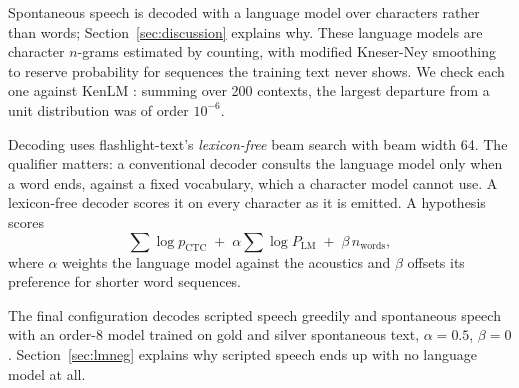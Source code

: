 Spontaneous speech is decoded with a language model over characters rather
than words; Section~\ref{sec:discussion} explains why. These language models
are character $n$-grams estimated by counting, with modified
Kneser-Ney smoothing \cite{chen1996smoothing} to reserve probability for
sequences the training text never shows. We check each one against KenLM
\cite{heafield2011kenlm}: summing over 200 contexts, the largest departure from
a unit distribution was of order $10^{-6}$.

Decoding uses flashlight-text's \emph{lexicon-free} beam search
\cite{kahn2022flashlight} with beam width 64. The qualifier matters: a
conventional decoder consults the language model only when a word ends, against
a fixed vocabulary, which a character model cannot use. A lexicon-free decoder
scores it on every character as it is emitted. A hypothesis scores
\begin{equation}
\sum \log p_{\text{CTC}}
\;+\; \alpha \sum \log P_{\text{LM}}
\;+\; \beta\,n_{\text{words}},
\label{eq:score}
\end{equation}
where $\alpha$ weights the language model against the acoustics and $\beta$
offsets its preference for shorter word sequences.

The final configuration decodes scripted speech greedily and spontaneous speech
with an order-8 model trained on gold and silver spontaneous text,
$\alpha = 0.5$, $\beta = 0$. Section~\ref{sec:lmneg} explains why scripted
speech ends up with no language model at all.
